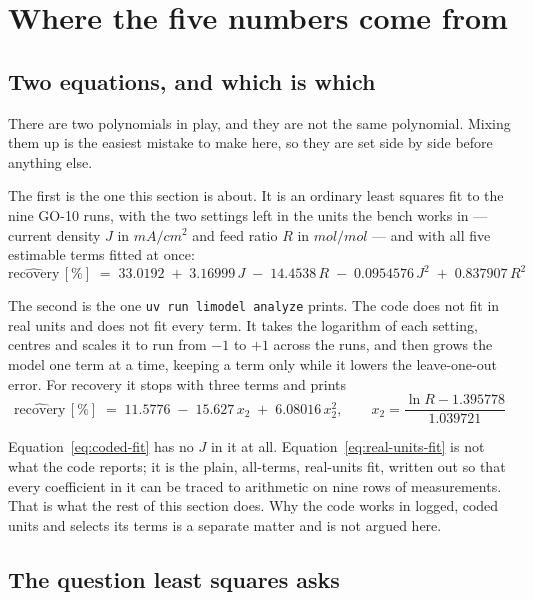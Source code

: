 \section{Where the five numbers come from}

\subsection{Two equations, and which is which}

There are two polynomials in play, and they are not the same polynomial. Mixing them up
is the easiest mistake to make here, so they are set side by side before anything else.

The first is the one this section is about. It is an ordinary least squares fit to the nine
GO-10 runs, with the two settings left in the units the bench works in --- current density
$J$ in $\unit{mA/cm^2}$ and feed ratio $R$ in $\unit{mol/mol}$ --- and with all five
estimable terms fitted at once:
%
\begin{equation}
  \widehat{\text{recovery}}\,[\%] \;=\; 33.0192 \;+\; 3.16999\,J \;-\; 14.4538\,R
  \;-\; 0.0954576\,J^{2} \;+\; 0.837907\,R^{2}
  \label{eq:real-units-fit}
\end{equation}

The second is the one \texttt{uv run limodel analyze} prints. The code does not fit in real
units and does not fit every term. It takes the logarithm of each setting, centres and scales
it to run from $-1$ to $+1$ across the runs, and then grows the model one term at a time,
keeping a term only while it lowers the leave-one-out error. For recovery it stops with three
terms and prints
%
\begin{equation}
  \widehat{\text{recovery}}\,[\%] \;=\; 11.5776 \;-\; 15.627\,x_2 \;+\; 6.08016\,x_2^{2},
  \qquad x_2 = \frac{\ln R - 1.395778}{1.039721}
  \label{eq:coded-fit}
\end{equation}

Equation~\eqref{eq:coded-fit} has no $J$ in it at all. Equation~\eqref{eq:real-units-fit} is
not what the code reports; it is the plain, all-terms, real-units fit, written out so that
every coefficient in it can be traced to arithmetic on nine rows of measurements. That is
what the rest of this section does. Why the code works in logged, coded units and selects its
terms is a separate matter and is not argued here.

\subsection{The question least squares asks}

